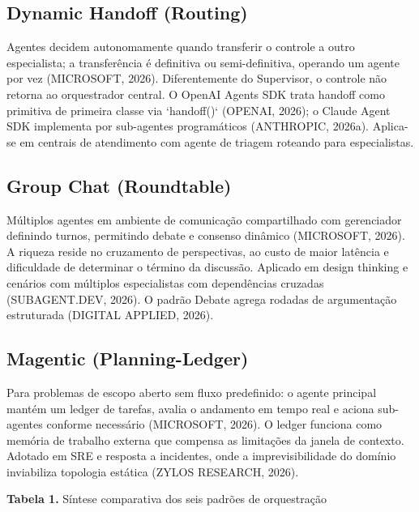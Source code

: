 \documentclass[12pt,a4paper]{article}
\begin{document}
\subsection{Dynamic Handoff (Routing)}

Agentes decidem autonomamente quando transferir o controle a outro especialista; a transferência é definitiva ou semi-definitiva, operando um agente por vez (MICROSOFT, 2026). Diferentemente do Supervisor, o controle não retorna ao orquestrador central. O OpenAI Agents SDK trata handoff como primitiva de primeira classe via `handoff()` (OPENAI, 2026); o Claude Agent SDK implementa por sub-agentes programáticos (ANTHROPIC, 2026a). Aplica-se em centrais de atendimento com agente de triagem roteando para especialistas.

\subsection{Group Chat (Roundtable)}

Múltiplos agentes em ambiente de comunicação compartilhado com gerenciador definindo turnos, permitindo debate e consenso dinâmico (MICROSOFT, 2026). A riqueza reside no cruzamento de perspectivas, ao custo de maior latência e dificuldade de determinar o término da discussão. Aplicado em design thinking e cenários com múltiplos especialistas com dependências cruzadas (SUBAGENT.DEV, 2026). O padrão Debate agrega rodadas de argumentação estruturada (DIGITAL APPLIED, 2026).

\subsection{Magentic (Planning-Ledger)}

Para problemas de escopo aberto sem fluxo predefinido: o agente principal mantém um ledger de tarefas, avalia o andamento em tempo real e aciona sub-agentes conforme necessário (MICROSOFT, 2026). O ledger funciona como memória de trabalho externa que compensa as limitações da janela de contexto. Adotado em SRE e resposta a incidentes, onde a imprevisibilidade do domínio inviabiliza topologia estática (ZYLOS RESEARCH, 2026).

\textbf{Tabela 1.} Síntese comparativa dos seis padrões de orquestração
\end{document}
